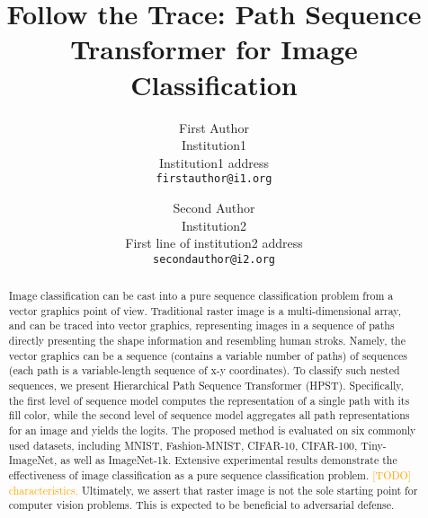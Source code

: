 \documentclass[10pt,twocolumn,letterpaper]{article}
\begin{document}
\title{Follow the Trace: Path Sequence Transformer for Image Classification}

\author{First Author\\
Institution1\\
Institution1 address\\
{\tt\small firstauthor@i1.org}
\and
Second Author\\
Institution2\\
First line of institution2 address\\
{\tt\small secondauthor@i2.org}
}
\maketitle

\begin{abstract}
    Image classification can be cast into a pure sequence classification
    problem from a vector graphics point of view.
    Traditional raster image is a multi-dimensional array, and
    can be traced into vector graphics, representing
    images in a sequence of paths directly presenting the shape information
    and resembling human stroks.
    Namely, the vector graphics can be a sequence (contains a
    variable number of paths) of sequences (each path is a variable-length
    sequence of x-y coordinates).
    To classify such nested sequences, we present Hierarchical Path Sequence
    Transformer (HPST).
    Specifically, the first level of sequence model computes the representation
    of a single path with its fill color, while the second level of sequence
    model aggregates all path representations for an image and yields
    the logits.
    The proposed method is evaluated on six commonly used datasets, including
    MNIST, Fashion-MNIST, CIFAR-10, CIFAR-100, Tiny-ImageNet, as well as ImageNet-1k.
    Extensive experimental results demonstrate the effectiveness of image
    classification as a pure sequence classification problem.
    \textcolor{orange}{[TODO] characteristics.}
    Ultimately, we assert that raster image is not the sole starting point
    for computer vision problems.
    This is expected to be beneficial to adversarial defense.
\end{abstract}
\end{document}
